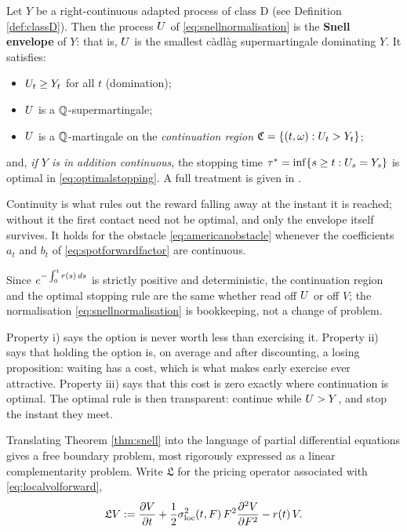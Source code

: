 \begin{theorem}\label{thm:snell}
Let $Y$ be a right-continuous adapted process of class D (see Definition \ref{def:classD}). Then
the process $U$ of \eqref{eq:snellnormalisation} is the \textbf{Snell envelope} of
$Y$: that is, $U$ is the smallest càdlàg supermartingale dominating $Y$. It satisfies:
\begin{itemize}
    \item[i)] $U_t \geq Y_t$ for all $t$ (domination);
    \item[ii)] $U$ is a $\mathbb{Q}$-supermartingale;
    \item[iii)] $U$ is a $\mathbb{Q}$-martingale on the \emph{continuation region}
    $\mathfrak{C} = \{(t,\omega) : U_t > Y_t\}$;
\end{itemize}
and, \emph{if $Y$ is in addition continuous}, the stopping time
$\tau^{*} = \inf\{ s \geq t : U_s = Y_s \}$ is optimal in \eqref{eq:optimalstopping}. A full
treatment is given in \cite{peskirshiryaev2006}. \qedopentext
\end{theorem}

Continuity is what rules out the reward falling away at the instant it is reached; without it the
first contact need not be optimal, and only the envelope itself survives. It holds for the obstacle
\eqref{eq:americanobstacle} whenever the coefficients $a_t$ and $b_t$ of
\eqref{eq:spotforwardfactor} are continuous.

Since $e^{-\int_0^t r(s)\,ds}$ is strictly positive and deterministic, the continuation region and
the optimal stopping rule are the same whether read off $U$ or off $V$; the normalisation
\eqref{eq:snellnormalisation} is bookkeeping, not a change of problem.

Property i) says the option is never worth less 
than exercising it. Property ii) says that holding the option is, on average and after discounting, a losing 
proposition: waiting has a cost, which is what makes early exercise ever attractive. Property iii) 
says that this cost is zero exactly where continuation is optimal. The optimal rule is then transparent: continue while 
$U > Y$, and stop the instant they meet.


Translating Theorem \ref{thm:snell} into the language of partial differential equations gives a free 
boundary problem, most rigorously expressed as a linear complementarity problem. Write
$\mathfrak{L}$ for the pricing operator associated with \eqref{eq:localvolforward},
\[
\mathfrak{L}V := \frac{\partial V}{\partial t} + \frac{1}{2}\sigma_{\mathrm{loc}}^2(t,F)\,F^2 \frac{\partial^2 V}{\partial F^2} - r(t)\,V .
\]

